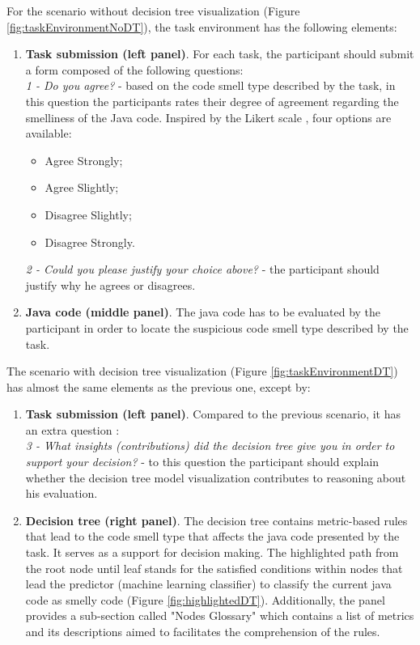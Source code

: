 For the scenario without decision tree visualization (Figure \ref{fig:taskEnvironmentNoDT}), the task environment has the following elements:
\begin{enumerate}
     \item \textbf{Task submission (left panel)}. For each task, the participant should submit a form composed of the following questions:\\
     \textit{1 - Do you agree?} - based on the code smell type described by the task, in this question the participants rates their degree of agreement regarding the smelliness of the Java code. Inspired by the Likert scale \cite{oppenheim2000questionnaire}, four options are available:
     \begin{itemize}
         \item Agree Strongly;
         \item Agree Slightly;
         \item Disagree Slightly;
         \item Disagree Strongly.
     \end{itemize}
     \textit{2 - Could you please justify your choice above?} - the participant should justify why he agrees or disagrees.
    \item \textbf{Java code (middle panel)}. The java code has to be evaluated by the participant in order to locate the suspicious code smell type described by the task.
\end{enumerate}

The scenario with decision tree visualization (Figure \ref{fig:taskEnvironmentDT}) has almost the same elements as the previous one, except by:
\begin{enumerate}
    \item \textbf{Task submission (left panel)}. Compared to the previous scenario, it has an extra question :    \\
     \textit{3 - What insights (contributions) did the decision tree give you in order to support your decision?} - to this question the participant should explain whether the decision tree model visualization contributes to reasoning about his evaluation.
    \item \textbf{Decision tree (right panel)}. The decision tree contains metric-based rules that lead to the code smell type that affects the java code presented by the task. It serves as a support for decision making. The highlighted path from the root node until leaf stands for the satisfied conditions within nodes that lead the predictor (machine learning classifier) to classify the current java code as smelly code (Figure \ref{fig:highlightedDT}). Additionally, the panel provides a sub-section called "Nodes Glossary" which contains a list of metrics and its descriptions aimed to facilitates the comprehension of the rules. 
\end{enumerate}

